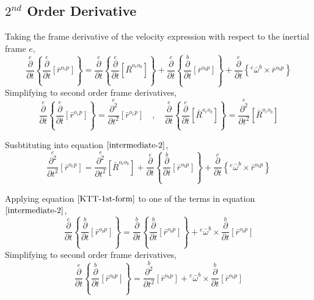 \documentclass[a4paper, 12pt]{report}
\begin{document}
\begin{center}
\section{$2^{nd}$ Order Derivative}
\begin{comment}
\end{comment}
Taking the frame derivative of the velocity expression with respect to the inertial frame $e$,
\begin{equation}
\overset{e}{\frac{\partial}{\partial t}}\left\{\overset{e}{\frac{\partial}{\partial t}}[\bar{r}^{o_{e}p}]\right\}      =    \overset{e}{\frac{\partial}{\partial t}}\left\{\overset{e}{\frac{\partial}{\partial t}}[\bar{R}^{o_{e}o_{b}}]\right\}     +  \overset{e}{\frac{\partial}{\partial t}}\left\{\overset{b}{\frac{\partial}{\partial t}}[\bar{r}^{o_{b}p}]\right\}      +   \overset{e}{\frac{\partial}{\partial t}}\left\{{}^{e}\bar{\omega}^{b}\times\bar{r}^{o_{b}p}\right\}
\label{intermediate-2}
\end{equation}
Simplifying to second order frame derivatives,
$$\overset{e}{\frac{\partial}{\partial t}}\left\{\overset{e}{\frac{\partial}{\partial t}}[\bar{r}^{o_{e}p}]\right\} = \overset{e}{\frac{\partial^{2}}{\partial t^{2}}}[\bar{r}^{o_{e}p}]\quad,\quad \overset{e}{\frac{\partial}{\partial t}}\left\{\overset{e}{\frac{\partial}{\partial t}}[\bar{R}^{o_{e}o_{b}}]\right\} =  \overset{e}{\frac{\partial^{2}}{\partial t^{2}}}[\bar{R}^{o_{e}o_{b}}]$$

Susbtituting into equation $\ref{intermediate-2}$,
\begin{equation}\overset{e}{\frac{\partial^{2}}{\partial t^{2}}}[\bar{r}^{o_{e}p}]    =    \overset{e}{\frac{\partial^{2}}{\partial t^{2}}}[\bar{R}^{o_{e}o_{b}}]     +  \overset{e}{\frac{\partial}{\partial t}}\left\{\overset{b}{\frac{\partial}{\partial t}}[\bar{r}^{o_{b}p}]\right\}      +   \overset{e}{\frac{\partial}{\partial t}}\left\{{}^{e}\bar{\omega}^{b}\times\bar{r}^{o_{b}p}\right\}\label{inter-4}\end{equation}

Applying equation $\ref{KTT-1st-form}$ to one of the terms in equation $\ref{intermediate-2}$,
$$\overset{e}{\frac{\partial}{\partial t}}\left\{\overset{b}{\frac{\partial}{\partial t}}[\bar{r}^{o_{b}p}]\right\} = \overset{b}{\frac{\partial}{\partial t}}\left\{\overset{b}{\frac{\partial}{\partial t}}[\bar{r}^{o_{b}p}]\right\} + {}^{e}\bar{\omega}^{b}\times\overset{b}{\frac{\partial}{\partial t}}[\bar{r}^{o_{b}p}]$$
Simplifying to second order frame derivatives,
\begin{equation}\overset{e}{\frac{\partial}{\partial t}}\left\{\overset{b}{\frac{\partial}{\partial t}}[\bar{r}^{o_{b}p}]\right\} = \overset{b}{\frac{\partial^{2}}{\partial t^{2}}}[\bar{r}^{o_{b}p}] + {}^{e}\bar{\omega}^{b}\times\overset{b}{\frac{\partial}{\partial t}}[\bar{r}^{o_{b}p}]\label{whammu-1}\end{equation}


\end{center}
\end{document}
